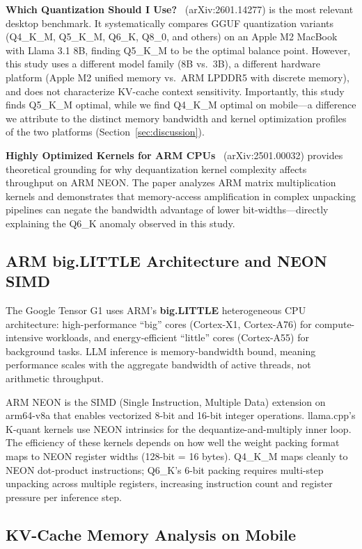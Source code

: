 \documentclass[conference]{IEEEtran}
\begin{document}
\textbf{Which Quantization Should I Use?}~\cite{whichquant} (arXiv:2601.14277)
is the most relevant desktop benchmark. It systematically compares GGUF
quantization variants (Q4\_K\_M, Q5\_K\_M, Q6\_K, Q8\_0, and others) on an
Apple M2 MacBook with Llama 3.1 8B, finding Q5\_K\_M to be the optimal balance
point. However, this study uses a different model family (8B vs.\ 3B), a
different hardware platform (Apple M2 unified memory vs.\ ARM LPDDR5 with
discrete memory), and does not characterize KV-cache context sensitivity.
Importantly, this study finds Q5\_K\_M optimal, while we find Q4\_K\_M optimal
on mobile---a difference we attribute to the distinct memory bandwidth and kernel
optimization profiles of the two platforms (Section~\ref{sec:discussion}).

\textbf{Highly Optimized Kernels for ARM CPUs}~\cite{armkernels}
(arXiv:2501.00032) provides theoretical grounding for why dequantization kernel
complexity affects throughput on ARM NEON. The paper analyzes
ARM matrix multiplication kernels and demonstrates that memory-access amplification
in complex unpacking pipelines can negate the bandwidth advantage of lower
bit-widths---directly explaining the Q6\_K anomaly observed in this study.

\subsection{ARM big.LITTLE Architecture and NEON SIMD}

The Google Tensor G1 uses ARM's \textbf{big.LITTLE} heterogeneous CPU
architecture: high-performance ``big'' cores (Cortex-X1, Cortex-A76) for
compute-intensive workloads, and energy-efficient ``little'' cores
(Cortex-A55) for background tasks. LLM inference is memory-bandwidth bound,
meaning performance scales with the aggregate bandwidth of active threads,
not arithmetic throughput.

ARM NEON is the SIMD (Single Instruction, Multiple Data) extension on
arm64-v8a that enables vectorized 8-bit and 16-bit integer operations.
llama.cpp's K-quant kernels use NEON intrinsics for the dequantize-and-multiply
inner loop. The efficiency of these kernels depends on how well the weight
packing format maps to NEON register widths (128-bit = 16 bytes). Q4\_K\_M
maps cleanly to NEON dot-product instructions; Q6\_K's 6-bit packing requires
multi-step unpacking across multiple registers, increasing instruction count
and register pressure per inference step.

\subsection{KV-Cache Memory Analysis on Mobile}
\end{document}
